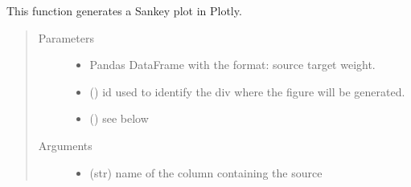 \documentclass[letterpaper,10pt,english]{sphinxmanual}
\begin{document}
\begin{fulllineitems}
\label{\detokenize{_autosummary/analytics_core.viz:analytics_core.viz.viz.get_sankey_plot}}
This function generates a Sankey plot in Plotly.
\begin{quote}\begin{description}
\item[{Parameters}] \leavevmode\begin{itemize}
\item {} 
 \textendash{} Pandas DataFrame with the format: source  target  weight.

\item {} 
 () \textendash{} id used to identify the div where the figure will be generated.

\item {} 
 () \textendash{} see below

\end{itemize}

\item[{Arguments}] \leavevmode\begin{itemize}
\item {} 
 (str) \textendash{} name of the column containing the source


\end{itemize}
\end{description}
\end{quote}
\end{fulllineitems}
\end{document}
